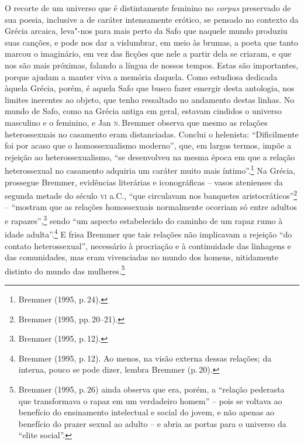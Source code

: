 O recorte de um universo que é distintamente feminino no \textit{corpus} preservado de sua poesia, inclusive
a de caráter intensamente erótico, se pensado no contexto da Grécia arcaica, leva"-nos para mais perto da Safo que naquele mundo produziu suas canções, e pode nos dar a vislumbrar, em meio às brumas, a poeta que tanto marcou o imaginário, em vez das ficções que nele a partir dela se criaram, e que nos são mais próximas, falando a língua de nossos tempos. Estas são importantes, porque ajudam a manter viva a memória daquela. Como estudiosa dedicada àquela Grécia, porém, é aquela Safo que busco fazer emergir desta antologia, nos limites inerentes ao objeto, que tenho ressaltado no andamento destas linhas. No mundo
de Safo, como na Grécia antiga em geral, estavam cindidos o universo masculino
e o feminino, e Jan \textsc{n}.\,Bremmer observa que mesmo as relações
heterossexuais no casamento eram distanciadas. Conclui o helenista:
“Dificilmente foi por acaso que o homossexualismo moderno”, que, em largos termos, impõe
a rejeição ao heterossexualismo, “se desenvolveu na mesma época em que a
relação heterossexual no casamento adquiria um caráter muito mais íntimo”.\footnote{ Bremmer (1995, p.\,24).} Na
Grécia, prossegue Bremmer, evidências literárias e iconográficas -- vasos
atenienses da segunda metade do século \textsc{vi} a.C., “que circulavam nos banquetes
aristocráticos”\footnote{ Bremmer (1995, pp.\,20--21).} -- “mostram que as relações homossexuais normalmente
ocorriam só entre adultos e rapazes”,\footnote{ Bremmer (1995, p.\,12).} sendo “um aspecto estabelecido do
caminho de um rapaz rumo à idade adulta”.\footnote{ Bremmer (1995, p.\,12). Ao menos, na visão
externa dessas relações; da interna, pouco se pode dizer, lembra Bremmer (p.\,20).} E frisa Bremmer que tais relações não implicavam a rejeição “do contato
heterossexual”, necessário à procriação e à continuidade das linhagens e das
comunidades, mas eram vivenciadas no mundo dos homens, nitidamente distinto do
mundo das mulheres.\footnote{ Bremmer (1995, p.\,26) ainda observa que era,
porém, a “relação pederasta que transformava o rapaz em um verdadeiro homem” --
pois se voltava ao benefício do ensinamento intelectual e social do jovem, e
não apenas ao benefício do prazer sexual ao adulto -- e abria as portas para o
universo da “elite social”.}

